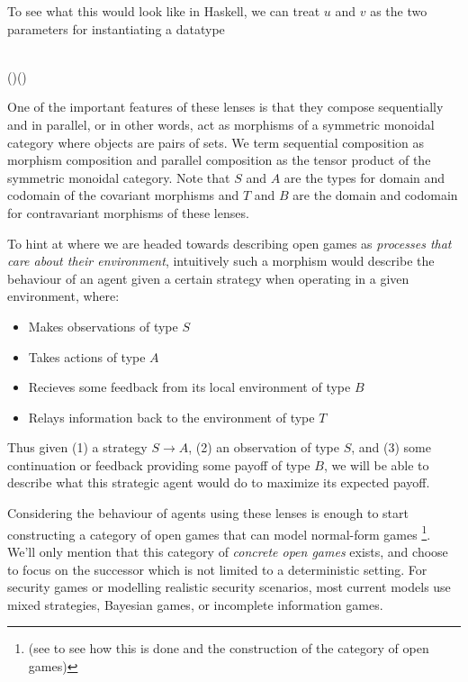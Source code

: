 \documentclass[11pt,titlepage,dvipsnames,table,xcdraw,english]{article}
\newcommand{\Conid}[1]{\mathit{#1}}
\newcommand{\Varid}[1]{\mathit{#1}}
\def\resethooks{%
  \global\let\SaveRestoreHook\empty
  \global\let\ColumnHook\empty}
\newcommand{\hsindent}[1]{\quad}%
\let\hspre\empty
\let\hspost\empty
\renewcommand{\Conid}[1]{{\color{funcColor}{#1}}}
\renewcommand{\Varid}[1]{{\color{typeColor}{#1}}}
\begin{document}
To see what this would look like in Haskell, we can treat $u$ and $v$ as the two parameters for instantiating 
a datatype


\begin{minipage}\textwidth
\begin{hscode}\SaveRestoreHook
\column{B}{@{}>{\hspre}l<{\hspost}@{}}%
\column{4}{@{}>{\hspre}l<{\hspost}@{}}%
\column{E}{@{}>{\hspre}l<{\hspost}@{}}%
\>[B]{}\;\Conid{Lens}\;\Varid{s}\;\Varid{t}\;\Varid{a}\;\Varid{b}\;\<[E]%
\\
\>[B]{}\hsindent{4}{}\<[4]%
\>[4]{}\Conid{Lens}\mathbin{::}(\Varid{s}\to \Varid{a})\to (\Varid{s}\to \Varid{b}\to \Varid{t})\to \Conid{Lens}\;\Varid{s}\;\Varid{t}\;\Varid{a}\;\Varid{b}{}\<[E]%
\ColumnHook
\end{hscode}\resethooks
\end{minipage}


One of the important features of these lenses is that they compose sequentially and in parallel,
or in other words, act as morphisms of a symmetric monoidal category where objects are pairs of sets. 
We term sequential composition as morphism composition and parallel composition as the tensor product of the 
symmetric monoidal category. Note that 
$S$ and $A$ are the types for domain and codomain of the
covariant morphisms and $T$ and $B$ are the domain and codomain for contravariant morphisms of these lenses.

To hint at where we are headed towards describing open games as \textit{processes that care about their environment}, intuitively
such a morphism would describe the behaviour of an agent given a certain strategy when operating 
in a given environment, where: 
\begin{itemize} \label{note:hint}
   \item Makes observations of type $S$
   \item Takes actions of type $A$
   \item Recieves some feedback from its local environment of type $B$
   \item Relays information back to the environment of type $T$
\end{itemize}
Thus given (1) a strategy $S \rightarrow A$, (2) an observation of type $S$, and (3) some continuation or feedback 
providing some payoff of type $B$, we will be able to describe what this strategic agent would do to maximize its expected payoff.

Considering the behaviour of agents using these lenses is enough to start constructing a category 
of open games that can model normal-form games \footnote{(see \cite{HedgesThesis,hedges2017morphismsopengames,BayesianOpenGames} to see how 
this is done and the construction of the category of open games)}. We'll only mention that this category of \textit{concrete open games}
exists, and choose to focus on the successor which is not limited to a deterministic setting. 
For security games or modelling realistic security scenarios, most current models use
mixed strategies, Bayesian games, or incomplete information games.
\end{document}
